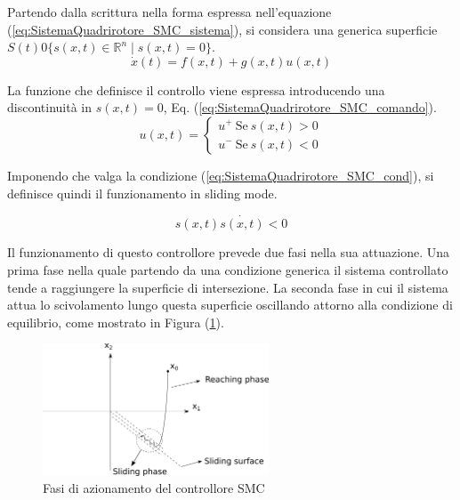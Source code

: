 Partendo dalla scrittura nella forma espressa nell'equazione (\ref{eq:SistemaQuadrirotore_SMC_sistema}), si considera una generica superficie $S(t) 0 \{ s(x,t) \in \mathbb{R}^n  \mid s(x,t) = 0\}$.
\begin{equation}\label{eq:SistemaQuadrirotore_SMC_sistema}
	\dot{x}(t) = f(x,t) +g(x,t) u(x,t)
\end{equation}

La funzione che definisce il controllo viene espressa introducendo una discontinuità in $s(x,t)=0$, Eq. (\ref{eq:SistemaQuadrirotore_SMC_comando}).
\begin{equation}\label{eq:SistemaQuadrirotore_SMC_comando}
	u(x,t) = \begin{cases}
		u^+ \ \text{Se} \ s(x,t) > 0 \\
		u^- \ \text{Se} \ s(x,t) < 0
	\end{cases}
\end{equation}

Imponendo che valga la condizione (\ref{eq:SistemaQuadrirotore_SMC_cond}), si definisce quindi il funzionamento in sliding mode.

\begin{equation}\label{eq:SistemaQuadrirotore_SMC_cond}
	s(x,t) \dot{s(x,t)} < 0
\end{equation}

Il funzionamento di questo controllore prevede due fasi nella sua attuazione. Una prima fase nella quale partendo da una condizione generica il sistema controllato tende a raggiungere la superficie di intersezione. La seconda fase in cui il sistema attua lo scivolamento lungo questa superficie oscillando attorno alla condizione di equilibrio, come mostrato in Figura (\ref{fig:SMC}).

\begin{figure}
	\centering
	\includegraphics[width=0.6\textwidth]{SistemaQuadrirotore/Figure/SMC_fasi}
	\caption{Fasi di azionamento del controllore SMC \cite{LiShihua2017AiVS}}
	\label{fig:SMC}
\end{figure}

